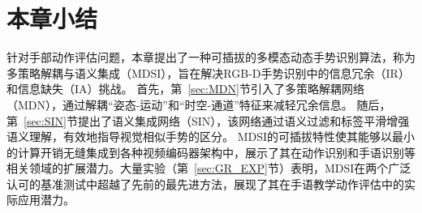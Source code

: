 \section{本章小结}
针对手部动作评估问题，本章提出了一种可插拔的多模态动态手势识别算法，称为多策略解耦与语义集成（MDSI），旨在解决RGB-D手势识别中的信息冗余（IR）和信息缺失（IA）挑战。
首先，第~\ref{sec:MDN}节引入了多策略解耦网络（MDN），通过解耦“姿态-运动”和“时空-通道”特征来减轻冗余信息。
随后，第~\ref{sec:SIN}节提出了语义集成网络（SIN），该网络通过语义过滤和标签平滑增强语义理解，有效地指导视觉相似手势的区分。
MDSI的可插拔特性使其能够以最小的计算开销无缝集成到各种视频编码器架构中，展示了其在动作识别和手语识别等相关领域的扩展潜力。大量实验（第~\ref{sec:GR_EXP}节）表明，MDSI在两个广泛认可的基准测试中超越了先前的最先进方法，展现了其在手语教学动作评估中的实际应用潜力。




